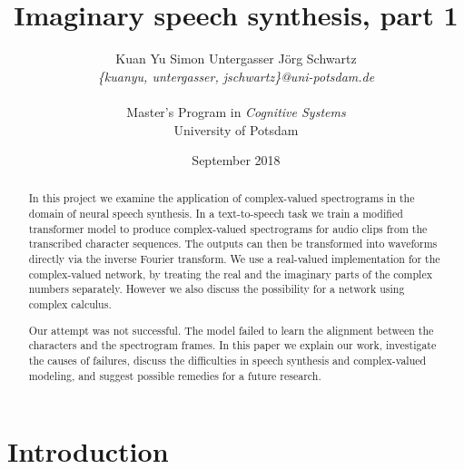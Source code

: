 \documentclass[11pt]{article}
\title{Imaginary speech synthesis, part 1}
\author{%
  Kuan Yu \qquad Simon Untergasser \qquad Jörg Schwartz\\
  \textit{\{kuanyu, untergasser, jschwartz\}@uni-potsdam.de}\\
  \\
  Master's Program in \emph{Cognitive Systems}\\
  University of Potsdam}
\date{September 2018}
\begin{document}
\maketitle


\begin{abstract}
  In this project we examine the application of complex-valued spectrograms
  in the domain of neural speech synthesis.
  In a text-to-speech task we train a modified transformer model to produce complex-valued spectrograms
  for audio clips from the transcribed character sequences.
  The outputs can then be transformed into waveforms directly via the inverse Fourier transform.
  We use a real-valued implementation for the complex-valued network,
  by treating the real and the imaginary parts of the complex numbers separately.
  However we also discuss the possibility for a network using complex calculus.

  Our attempt was not successful.
  The model failed to learn the alignment between the characters and the spectrogram frames.
  In this paper we explain our work,
  investigate the causes of failures,
  discuss the difficulties in speech synthesis and complex-valued modeling,
  and suggest possible remedies for a future research.
\end{abstract}

\section{Introduction}
\end{document}
